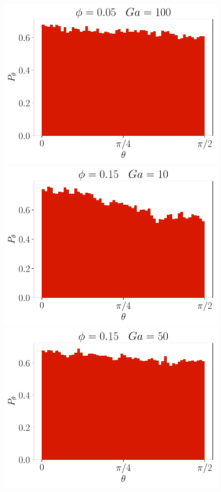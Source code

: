 \begin{figure}[h!]
    \includegraphics[height =\size]{image/N_10/beta/2DMAP_theta_dmin_10_Bo1PHI0_05mu_r0_042Ga100.pdf}
    \includegraphics[height =\size]{image/N_10/beta/2DMAP_theta_dmin_10_Bo1PHI0_15mu_r0_042Ga10.pdf}
    \includegraphics[height =\size]{image/N_10/beta/2DMAP_theta_dmin_10_Bo1PHI0_15mu_r0_042Ga50.pdf}

\end{figure}
